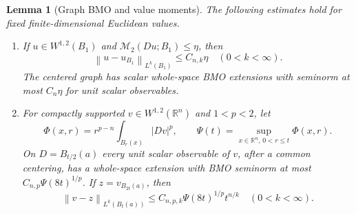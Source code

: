 \documentclass[reqno,11pt]{amsart}
\numberwithin{equation}{section}
\newtheorem{lemma}[theorem]{Lemma}
\theoremstyle{definition}
\theoremstyle{remark}
\newcommand{\R}{\mathbb R}
\newcommand{\M}{\mathcal M}
\newcommand{\norm}[1]{\left\lVert#1\right\rVert}
\begin{document}
\begin{lemma}[Graph BMO and value moments]\label{lem:moments}
The following estimates hold for fixed finite-dimensional Euclidean values.
\begin{enumerate}[label=\textup{(\roman*)}]
\item If $u\in W^{1,2}(B_1)$ and $\M_2(Du;B_1)\leq\eta$, then
\begin{equation}\label{eq:critical-moments}
 \norm{u-u_{B_1}}_{L^k(B_1)}\leq C_{n,k}\eta\quad(0<k<\infty).
\end{equation}
The centered graph has scalar whole-space BMO extensions with seminorm
at most $C_n\eta$ for unit scalar observables.
\item For compactly supported $v\in W^{1,2}(\R^n)$ and $1<p<2$, let
\begin{equation}\label{eq:envelope}
 \Phi(x,r)=r^{p-n}\int_{B_r(x)}|Dv|^p,\qquad
 \Psi(t)=\sup_{x\in\R^n,\,0<r\leq t}\Phi(x,r).
\end{equation}
On $D=B_{t/2}(a)$ every unit scalar observable of $v$, after a common
centering, has a whole-space extension with BMO seminorm at most
$C_{n,p}\Psi(8t)^{1/p}$. If $z=v_{B_{2t}(a)}$, then
\begin{equation}\label{eq:local-moments}
 \norm{v-z}_{L^k(B_t(a))}
 \leq C_{n,p,k}\Psi(8t)^{1/p}t^{n/k}\quad(0<k<\infty).
\end{equation}
\end{enumerate}
\end{lemma}
\end{document}
